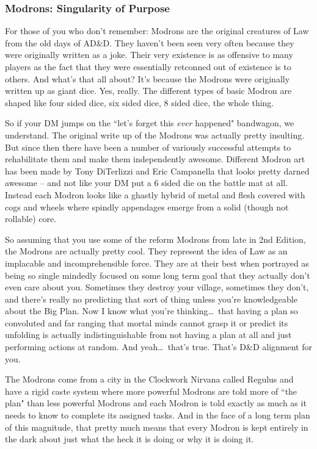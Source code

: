 \subsubsection{Modrons: Singularity of Purpose}

For those of you who don't remember: Modrons are the original creatures of Law from the old days of AD\&D. They haven't been seen very often because they were originally written as a joke. Their very existence is as offensive to many players as the fact that they were essentially retconned out of existence is to others. And what's that all about? It's because the Modrons were originally written up as giant dice. Yes, really. The different types of basic Modron are shaped like four sided dice, six sided dice, 8 sided dice, the whole thing.

So if your DM jumps on the ``let's forget this \textit{ever} happened" bandwagon, we understand. The original write up of the Modrons was actually pretty insulting. But since then there have been a number of variously successful attempts to rehabilitate them and make them independently awesome. Different Modron art has been made by Tony DiTerlizzi and Eric Campanella that looks pretty darned awesome -- and not like your DM put a 6 sided die on the battle mat at all. Instead each Modron looks like a ghastly hybrid of metal and flesh covered with cogs and wheels where spindly appendages emerge from a solid (though not rollable) core.

So assuming that you use some of the reform Modrons from late in 2nd Edition, the Modrons are actually pretty cool. They represent the idea of Law as an implacable and incomprehensible force. They are at their best when portrayed as being so single mindedly focused on some long term goal that they actually don't even care about you. Sometimes they destroy your village, sometimes they don't, and there's really no predicting that sort of thing unless you're knowledgeable about the Big Plan. Now I know what you're thinking\ldots\ that having a plan so convoluted and far ranging that mortal minds cannot grasp it or predict its unfolding is actually indistinguishable from not having a plan at all and just performing actions at random. And yeah\ldots\ that's true. That's D\&D alignment for you.

The Modrons come from a city in the Clockwork Nirvana called Regulus and have a rigid caste system where more powerful Modrons are told more of ``the plan" than less powerful Modrons and each Modron is told exactly as much as it needs to know to complete its assigned tasks. And in the face of a long term plan of this magnitude, that pretty much means that every Modron is kept entirely in the dark about just what the heck it is doing or why it is doing it.
